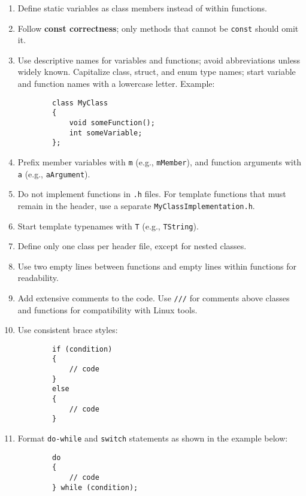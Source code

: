 \documentclass{article}
\begin{document}
\begin{enumerate}[left=0pt, align=left]
    \item Define static variables as class members instead of within functions.

    \item Follow \textbf{const correctness}; only methods that cannot be \texttt{const} should omit it.

    \item Use descriptive names for variables and functions; avoid abbreviations unless widely known. Capitalize class, struct, and enum type names; start variable and function names with a lowercase letter. Example:
    \begin{verbatim}
        class MyClass
        {
            void someFunction();
            int someVariable;
        };
    \end{verbatim}

    \item Prefix member variables with \texttt{m} (e.g., \texttt{mMember}), and function arguments with \texttt{a} (e.g., \texttt{aArgument}).

    \item Do not implement functions in \texttt{.h} files. For template functions that must remain in the header, use a separate \texttt{MyClassImplementation.h}.

    \item Start template typenames with \texttt{T} (e.g., \texttt{TString}).

    \item Define only one class per header file, except for nested classes.

    \item Use two empty lines between functions and empty lines within functions for readability.

    \item Add extensive comments to the code. Use \texttt{///} for comments above classes and functions for compatibility with Linux tools.

    \item Use consistent brace styles:
    \begin{verbatim}
        if (condition)
        {
            // code
        }
        else
        {
            // code
        }
    \end{verbatim}

    \item Format \texttt{do-while} and \texttt{switch} statements as shown in the example below:
    \begin{verbatim}
        do
        {
            // code
        } while (condition);


\end{verbatim}
\end{enumerate}
\end{document}
